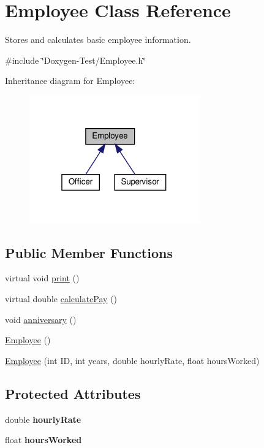 \hypertarget{classEmployee}{}\section{Employee Class Reference}
\label{classEmployee}


Stores and calculates basic employee information.  




{\ttfamily \#include \char`\"{}Doxygen-\/\+Test/\+Employee.\+h\char`\"{}}



Inheritance diagram for Employee\+:
\nopagebreak
\begin{figure}[H]
\begin{center}
\leavevmode
\includegraphics[width=208pt]{classEmployee__inherit__graph}
\end{center}
\end{figure}
\subsection*{Public Member Functions}
\begin{DoxyCompactItemize}
\item 
virtual void \hyperlink{classEmployee_a79556ad700627dba88049f487a34a762}{print} ()
\item 
virtual double \hyperlink{classEmployee_a01c2c44e15434237db28832f6972e960}{calculate\+Pay} ()
\item 
void \hyperlink{classEmployee_a67c345031cf63f515fb09dc675dee5f3}{anniversary} ()
\item 
\hyperlink{classEmployee_a003c7bd08c40924e381eb0750cbb906f}{Employee} ()
\item 
\hyperlink{classEmployee_ad0c935ef9a290a82dcf7865172c90148}{Employee} (int ID, int years, double hourly\+Rate, float hours\+Worked)
\end{DoxyCompactItemize}
\subsection*{Protected Attributes}
\begin{DoxyCompactItemize}
\item 
\mbox{\label{classEmployee_ac31134abb9b4004fc015e51ef579b069}} 
double {\bfseries hourly\+Rate}
\item 
\mbox{\label{classEmployee_afde35c73d02eb1cfe89e23a80998b42e}} 
float {\bfseries hours\+Worked}
\end{DoxyCompactItemize}
